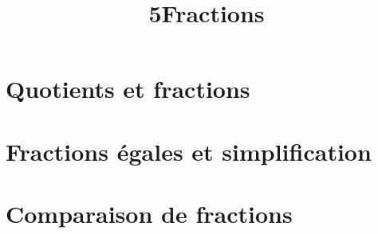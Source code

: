 \documentclass[12pt,a4paper]{article}
\date{}
\title{\textcircled{{\normalsize{5}}}Fractions}
\begin{document}
	\maketitle








\vspace{-0.5cm}

\section{Quotients et fractions}



%
%

\section{Fractions égales et simplification}



\section{Comparaison de fractions}



%
%
%

%
\end{document}
